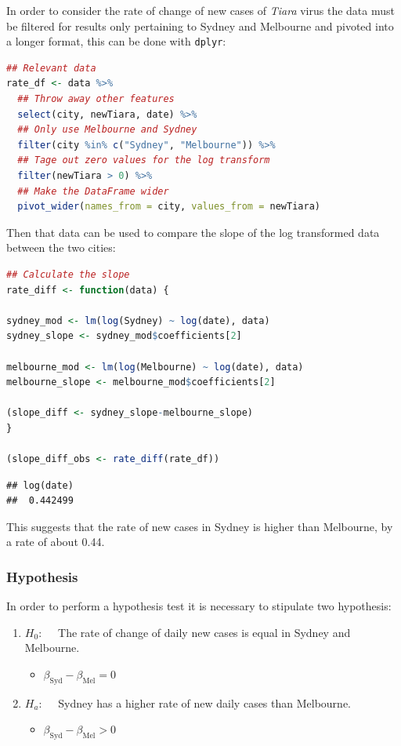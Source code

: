 \documentclass{article}
\newcommand{\passthrough}[1]{#1}
\providecommand{\tightlist}{%
  \setlength{\itemsep}{0pt}\setlength{\parskip}{0pt}}
\begin{document}
In order to consider the rate of change of new cases of \emph{Tiara}
virus the data must be filtered for results only pertaining to Sydney
and Melbourne and pivoted into a longer format, this can be done with
\passthrough{\lstinline!dplyr!}:

\begin{lstlisting}[language=R]
## Relevant data
rate_df <- data %>% 
  ## Throw away other features
  select(city, newTiara, date) %>% 
  ## Only use Melbourne and Sydney
  filter(city %in% c("Sydney", "Melbourne")) %>% 
  ## Tage out zero values for the log transform
  filter(newTiara > 0) %>% 
  ## Make the DataFrame wider
  pivot_wider(names_from = city, values_from = newTiara)
\end{lstlisting}

Then that data can be used to compare the slope of the log transformed
data between the two cities:

\begin{lstlisting}[language=R]
## Calculate the slope
rate_diff <- function(data) {
  
sydney_mod <- lm(log(Sydney) ~ log(date), data)
sydney_slope <- sydney_mod$coefficients[2]

melbourne_mod <- lm(log(Melbourne) ~ log(date), data)
melbourne_slope <- melbourne_mod$coefficients[2]

(slope_diff <- sydney_slope-melbourne_slope)
}

(slope_diff_obs <- rate_diff(rate_df))
\end{lstlisting}

\begin{lstlisting}
## log(date) 
##  0.442499
\end{lstlisting}

This suggests that the rate of new cases in Sydney is higher than
Melbourne, by a rate of about 0.44.

\hypertarget{hypothesis-1}{%
\subsubsection{Hypothesis}\label{hypothesis-1}}

In order to perform a hypothesis test it is necessary to stipulate two
hypothesis:

\begin{enumerate}
\def\labelenumi{\arabic{enumi}.}
\tightlist
\item
  \(H_0: \quad\) The rate of change of daily new cases is equal in
  Sydney and Melbourne.

  \begin{itemize}
  \tightlist
  \item
    \(\beta_\mathrm{Syd} - \beta_\mathrm{Mel} = 0\)
  \end{itemize}
\item
  \(H_a: \quad\) Sydney has a higher rate of new daily cases than
  Melbourne.

  \begin{itemize}
  \tightlist
  \item
    \(\beta_\mathrm{Syd} - \beta_\mathrm{Mel} > 0\)
  \end{itemize}
\end{enumerate}
\end{document}
